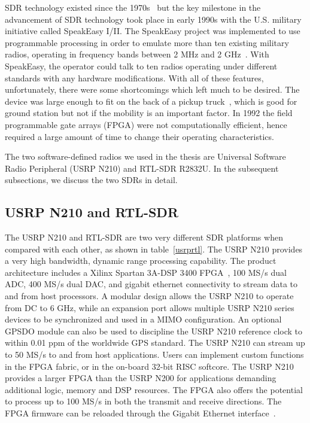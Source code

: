 SDR technology existed since the 1970s~\cite{bookhtn1} but the key milestone in the advancement of SDR technology took place in early 1990s with the U.S. military initiative called SpeakEasy I/II. The SpeakEasy project was implemented to use programmable processing in order to emulate more than ten existing military radios, operating in frequency bands between 2 MHz and 2 GHz~\cite{392998}. With SpeakEasy, the operator could talk to ten radios operating under different standards with any hardware modifications. With all of these features, unfortunately, there were some shortcomings which left much to be desired. The device was large enough to fit on the back of a pickup truck~\cite{392998}, which is good for ground station but not if the mobility is an important factor. In 1992 the field programmable gate arrays (FPGA) were not computationally efficient, hence required a large amount of time to change their operating characteristics. 

The two software-defined radios we used in the thesis are Universal Software Radio Peripheral (USRP N210) and RTL-SDR R2832U. In the subsequent subsections, we discuss the two SDRs in detail.

\subsection{USRP N210 and RTL-SDR}
The USRP N210 and RTL-SDR are two very different SDR platforms when compared with each other, as shown in table~\ref{usrprtl}. The USRP N210 provides a very high bandwidth, dynamic range processing capability. The product architecture includes a Xilinx Spartan 3A-DSP 3400 FPGA~\cite{xilinx}, 100 MS/s dual ADC, 400 MS/s dual DAC, and gigabit ethernet connectivity to stream data to and from host processors. A modular design allows the USRP N210 to operate from DC to 6 GHz, while an expansion port allows multiple USRP N210 series devices to be synchronized and used in a MIMO configuration. An optional GPSDO module can also be used to discipline the USRP N210 reference clock to within 0.01 ppm of the worldwide GPS standard. The USRP N210 can stream up to 50 MS/s to and from host applications. Users can implement custom functions in the FPGA fabric, or in the on-board 32-bit RISC softcore. The USRP N210 provides a larger FPGA than the USRP N200 for applications demanding additional logic, memory and DSP resources. The FPGA also offers the potential to process up to 100 MS/s in both the transmit and receive directions. The FPGA firmware can be reloaded through the Gigabit Ethernet interface~\cite{usrp}.


